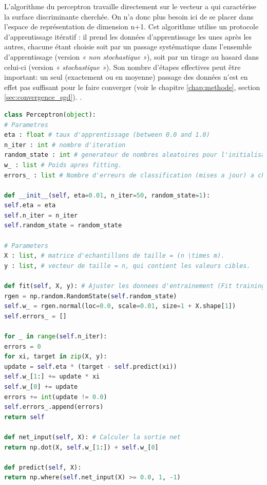 L'algorithme du perceptron travaille directement sur le vecteur a qui caractérise la surface discriminante cherchée. On n'a donc plus besoin ici de se placer dans l'espace de représentation de dimension n+1. Cet algorithme utilise un protocole d'apprentissage itératif : il prend les données d'apprentissage les unes après les autres, chacune étant choisie soit par un passage systématique dans l'ensemble d'apprentissage (version \textit{« non stochastique »}), soit par un tirage au hasard dans celui-ci (version\textit{ « stochastique »}). Son nombre d'étapes effectives peut être important: un seul (exactement ou en moyenne) passage des données n'est en effet pas suffisant pour le faire converger (voir le chapitre \ref{chap:methode}, section \ref{sec:convergence_sgd}). \cite{antoine2018apprentissage}.



\begin{lstlisting}[language=python]
class Perceptron(object):
# Parametres
eta : float # taux d'apprentissage (between 0.0 and 1.0)
n_iter : int # nombre d'iteration
random_state : int # generateur de nombres aleatoires pour l'initialisation de poids aleatoire.
w_ : list # Poids apres fitting.
errors_ : list # Nombre d'erreurs de classification (mises a jour) a chaque epoque.

def __init__(self, eta=0.01, n_iter=50, random_state=1):
self.eta = eta
self.n_iter = n_iter
self.random_state = random_state

# Parameters
X : list, # matrice d'echantillons de taille = (n \times m).
y : list, # vecteur de taille = n, qui contient les valeurs cibles.

def fit(self, X, y): # Ajuster les donnees d'entrainement (Fit training data).
rgen = np.random.RandomState(self.random_state)
self.w_ = rgen.normal(loc=0.0, scale=0.01, size=1 + X.shape[1])
self.errors_ = []

for _ in range(self.n_iter):
errors = 0
for xi, target in zip(X, y):
update = self.eta * (target - self.predict(xi))
self.w_[1:] += update * xi
self.w_[0] += update
errors += int(update != 0.0)
self.errors_.append(errors)
return self

def net_input(self, X): # Calculer la sortie net
return np.dot(X, self.w_[1:]) + self.w_[0]

def predict(self, X):
return np.where(self.net_input(X) >= 0.0, 1, -1)
\end{lstlisting}

